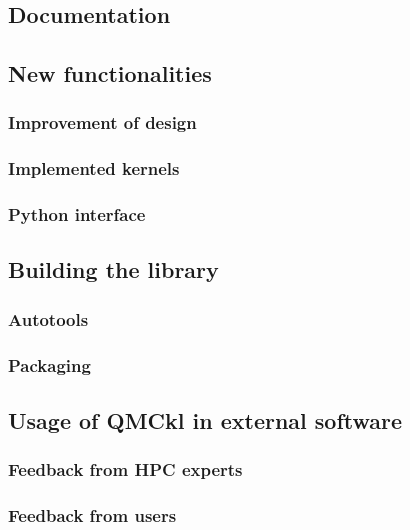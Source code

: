 \subsection{Documentation}

\subsection{New functionalities}

\subsubsection{Improvement of design}

\subsubsection{Implemented kernels}

\subsubsection{Python interface}


\subsection{Building the library}

\subsubsection{Autotools}

\subsubsection{Packaging}

\subsection{Usage of QMCkl in external software}

\subsubsection{Feedback from HPC experts}

\subsubsection{Feedback from users}

